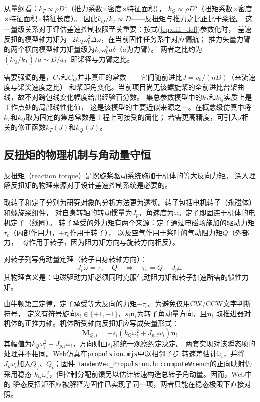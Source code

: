 从量纲看：$k_T \propto \rho D^4$（推力系数$\times$密度$\times$特征面积），
$k_Q \propto \rho D^5$（扭矩系数$\times$密度$\times$特征面积$\times$特征长度）。
因此$k_Q / k_T \propto D$——反扭矩与推力之比正比于桨径。
这一量级关系对于评估差速控制权限至关重要：按式(\ref{eq:diff_def})参数化时，
差速反扭的模型轴力矩为$-2k_Q\omega_0^2\Delta\omega$，在当前固件任务系中对应偏航；
推力矢量力臂的两个横向模型轴力矩量级为$k_T\omega_0^2a\delta$（$a$为力臂）。
两者之比约为$(k_Q / k_T) / a \sim D / a$，即桨径与力臂之比。

需要强调的是，$C_T$和$C_Q$并非真正的常数——它们随前进比$J = v_0/(nD)$（来流速度与桨尖速度之比）
和桨距角变化。当前项目尚无该螺旋桨的全前进比台架曲线，故不对跨包线变化幅度给出经验百分数。
集总参数模型中的$k_T$和$k_Q$实质上是工作点处的局部线性化值，
这是该模型的主要近似来源之一。在概念级仿真中将$k_T$和$k_Q$取为固定的集总常数是工程上可接受的简化；
若需更高精度，可引入$J$相关的修正函数$k_T(J)$和$k_Q(J)$。

\subsection{反扭矩的物理机制与角动量守恒}

反扭矩（reaction torque）是螺旋桨驱动系统施加于机体的等大反向力矩。
深入理解反扭矩的物理来源对于设计差速控制系统是必要的。

取转子和定子分别为研究对象的分析方法更为透彻。转子包括电机转子（永磁体）和螺旋桨组件，
对自身转轴的转动惯量为$J_p$，角速度为$\omega$。定子即固连于机体的电机定子（线圈）。
转子承受的外力矩有两个来源：定子通过电磁场施加的驱动力矩$\tau_e$（内部作用力，$+\tau_e$作用于转子），
以及空气作用于桨叶的气动阻力矩$Q$（外部力，$-Q$作用于转子，因为阻力矩方向与旋转方向相反）\cite{ducard2011fault}。

对转子列写角动量定理（转子自身转轴方向）：
\begin{equation}
    J_p \dot{\omega} = \tau_e - Q \quad\Longrightarrow\quad
    \tau_e = Q + J_p \dot{\omega}
    \label{eq:rotor_angular}
\end{equation}
其物理含义是：电磁驱动力矩必须同时克服气动阻力矩和转子加速所需的惯性力矩。

由牛顿第三定律，定子承受等大反向的力矩$-\tau_e$。为避免仅用CW/CCW文字判断符号，
定义有符号旋向$s_i\in\{+1,-1\}$，$s_i\bm n_i$为转子角动量方向，且$\bm n_i$
取推进器对机体的正推力轴。机体所受轴向反扭矩应写成矢量形式：
\begin{equation}
    \boxed{\bm M_{Q,i}=-s_i\left(k_Q\omega_i^2+J_{p,i}\dot\omega_i\right)\bm n_i}
    \label{eq:reaction_torque}
\end{equation}
其幅值为$k_Q\omega_i^2+J_{p,i}\dot\omega_i$，方向则由$s_i$和统一观察约定决定。
两套实现对该瞬态项的处理并不相同。Web仿真在\texttt{propulsion.mjs}中以相邻子步
转速差估计$\dot\omega_i$，并将$J_p\dot\omega_i$加入$Q_f$、$Q_t$；固件
\texttt{TandemVec\_Propulsion.h::computeWrench}的正向映射仍采用稳态
$k_Q\omega_i^2$，但控制分配前馈另以估计转速构造总转子角动量。因而，Web中的
瞬态反扭矩不应被解释为固件已实现了同一项，两者只能在稳态极限下直接对照。


